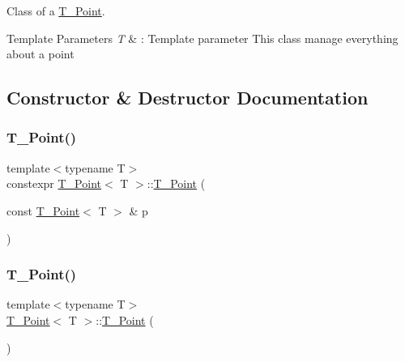 Class of a \hyperlink{classT__Point}{T\+\_\+\+Point}. 


\begin{DoxyTemplParams}{Template Parameters}
{\em T} & \+: Template parameter This class manage everything about a point \\
\hline
\end{DoxyTemplParams}


\subsection{Constructor \& Destructor Documentation}
\mbox{\label{classT__Point_af313da04154273b9a75d66e9950359ea}} 
\subsubsection{\texorpdfstring{T\+\_\+\+Point()}{T\_Point()}\hspace{0.1cm}{\footnotesize\ttfamily [1/4]}}
{\footnotesize\ttfamily template$<$typename T$>$ \\
constexpr \hyperlink{classT__Point}{T\+\_\+\+Point}$<$ T $>$\+::\hyperlink{classT__Point}{T\+\_\+\+Point} (\begin{DoxyParamCaption}\item[{const \hyperlink{classT__Point}{T\+\_\+\+Point}$<$ T $>$ \&}]{p }\end{DoxyParamCaption})\hspace{0.3cm}{\ttfamily [default]}}

\mbox{\label{classT__Point_a61017b12d3c2aa88a242dbbc57733413}} 
\subsubsection{\texorpdfstring{T\+\_\+\+Point()}{T\_Point()}\hspace{0.1cm}{\footnotesize\ttfamily [2/4]}}
{\footnotesize\ttfamily template$<$typename T$>$ \\
\hyperlink{classT__Point}{T\+\_\+\+Point}$<$ T $>$\+::\hyperlink{classT__Point}{T\+\_\+\+Point} (\begin{DoxyParamCaption}{ }\end{DoxyParamCaption})\hspace{0.3cm}{\ttfamily [inline]}}



